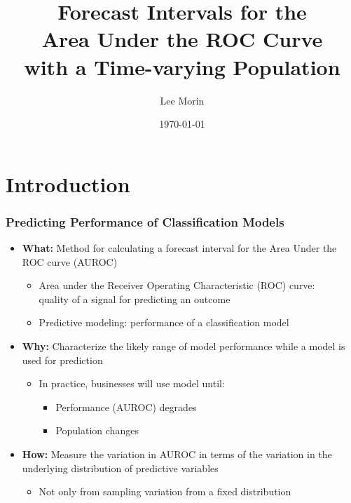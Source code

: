 \documentclass{beamer}
\title[Forecast Intervals for the 
    Area Under the ROC Curve]{Forecast Intervals for the \\
    Area Under the ROC Curve \\
    with a Time-varying Population}
\author[Lee Morin, Queen's University]{Lee Morin}
\institute[Queen's University]
{
    Department of Economics \\
    Queen's University
}
\date{\today}
\begin{document}

\frame{\titlepage}

\section[Outline]{}

\frame{\tableofcontents}




\section{Introduction}



\begin{frame}
\frametitle{Predicting Performance of Classification Models}

\begin{itemize}
    \item \textbf{What:} Method for calculating a forecast interval for the Area Under the ROC curve (AUROC)
    \begin{itemize}
        \item Area under the Receiver Operating Characteristic (ROC) curve: \\
        quality of a signal for predicting an outcome
        \item Predictive modeling: performance of a classification model
    \end{itemize}
    \item \textbf{Why:} Characterize the likely range of model performance while a model is used for prediction
    \begin{itemize}
        \item In practice, businesses will use model until:
        \begin{itemize}
            \item Performance (AUROC) degrades
            \item Population changes
        \end{itemize}
    \end{itemize}
    \item \textbf{How:} Measure the variation in AUROC in terms of the variation in the underlying distribution of predictive variables
    \begin{itemize}
        \item Not only from sampling variation from a fixed distribution
    \end{itemize}
\end{itemize}

\end{frame}
\end{document}
